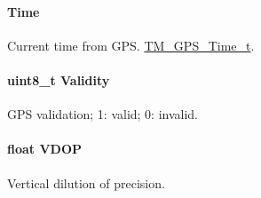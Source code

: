 \paragraph[{Time}]{ Time}\label{struct_t_m___g_p_s___data__t_a57a7872a3ef75ec2fdb0178b6250ccfc}
Current time from G\+P\+S. \hyperlink{struct_t_m___g_p_s___time__t}{T\+M\+\_\+\+G\+P\+S\+\_\+\+Time\+\_\+t}. \hypertarget{struct_t_m___g_p_s___data__t_a5ef71b2bdce07e7189b2ab1c05773f66}{}
\paragraph[{Validity}]{\setlength{\rightskip}{0pt plus 5cm}uint8\+\_\+t Validity}\label{struct_t_m___g_p_s___data__t_a5ef71b2bdce07e7189b2ab1c05773f66}
G\+P\+S validation; 1\+: valid; 0\+: invalid. \hypertarget{struct_t_m___g_p_s___data__t_a560dd464380970f473ab405e6bd61169}{}
\paragraph[{V\+D\+O\+P}]{\setlength{\rightskip}{0pt plus 5cm}float V\+D\+O\+P}\label{struct_t_m___g_p_s___data__t_a560dd464380970f473ab405e6bd61169}
Vertical dilution of precision. 